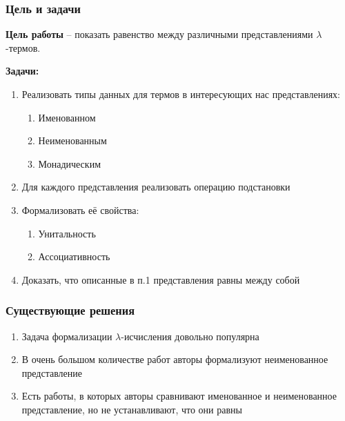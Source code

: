 \documentclass{beamer}
\begin{document}
\begin{frame}\frametitle{Цель и задачи}
    \textbf{Цель работы} -- показать равенство между различными представлениями $\lambda$-термов.

    \bigskip

    \textbf{Задачи:}
    \begin{enumerate}
        \item Реализовать типы данных для термов в интересующих нас представлениях:
          \begin{enumerate}
            \item Именованном
            \item Неименованным
            \item Монадическим
          \end{enumerate}
        \item Для каждого представления реализовать операцию подстановки
        \item Формализовать её свойства:
          \begin{enumerate}
            \item Унитальность
            \item Ассоциативность
          \end{enumerate}
        \item Доказать, что описанные в п.1 представления равны между собой
    \end{enumerate}
\end{frame}

\begin{frame}\frametitle{Существующие решения}
    \begin{enumerate}
        \item Задача формализации $\lambda$-исчисления довольно популярна
        \item В очень большом количестве работ авторы формализуют неименованное представление
        \item Есть работы, в которых авторы сравнивают именованное и неименованное представление, но не устанавливают, что они равны
    \end{enumerate}
\end{frame}
\end{document}

